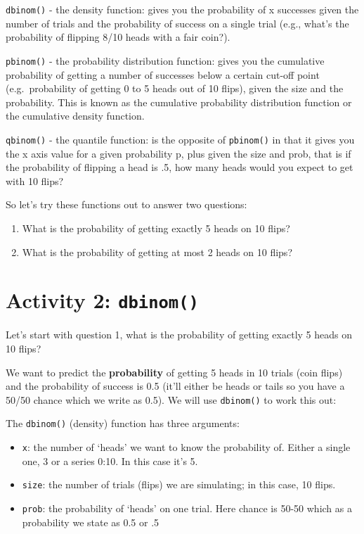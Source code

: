 \documentclass[
  oneside]{book}
\providecommand{\tightlist}{%
  \setlength{\itemsep}{0pt}\setlength{\parskip}{0pt}}
\begin{document}
\texttt{dbinom()} - the density function: gives you the probability of x successes given the number of trials and the probability of success on a single trial (e.g., what's the probability of flipping 8/10 heads with a fair coin?).

\texttt{pbinom()} - the probability distribution function: gives you the cumulative probability of getting a number of successes below a certain cut-off point (e.g.~probability of getting 0 to 5 heads out of 10 flips), given the size and the probability. This is known as the cumulative probability distribution function or the cumulative density function.

\texttt{qbinom()} - the quantile function: is the opposite of \texttt{pbinom()} in that it gives you the x axis value for a given probability p, plus given the size and prob, that is if the probability of flipping a head is .5, how many heads would you expect to get with 10 flips?

So let's try these functions out to answer two questions:

\begin{enumerate}
\def\labelenumi{\arabic{enumi}.}
\tightlist
\item
  What is the probability of getting exactly 5 heads on 10 flips?
\item
  What is the probability of getting at most 2 heads on 10 flips?
\end{enumerate}

\hypertarget{activity-2-dbinom}{%
\section{\texorpdfstring{Activity 2: \texttt{dbinom()}}{Activity 2: dbinom()}}\label{activity-2-dbinom}}

Let's start with question 1, what is the probability of getting exactly 5 heads on 10 flips?

We want to predict the \textbf{probability} of getting 5 heads in 10 trials (coin flips) and the probability of success is 0.5 (it'll either be heads or tails so you have a 50/50 chance which we write as 0.5). We will use \texttt{dbinom()} to work this out:

The \texttt{dbinom()} (density) function has three arguments:

\begin{itemize}
\item
  \texttt{x}: the number of `heads' we want to know the probability of. Either a single one, 3 or a series 0:10. In this case it's 5.
\item
  \texttt{size}: the number of trials (flips) we are simulating; in this case, 10 flips.
\item
  \texttt{prob}: the probability of `heads' on one trial. Here chance is 50-50 which as a probability we state as 0.5 or .5
\end{itemize}
\end{document}
